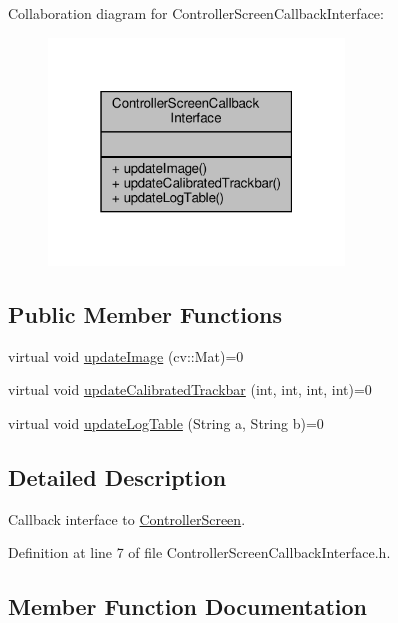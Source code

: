 Collaboration diagram for Controller\+Screen\+Callback\+Interface\+:
\nopagebreak
\begin{figure}[H]
\begin{center}
\leavevmode
\includegraphics[width=223pt]{class_controller_screen_callback_interface__coll__graph}
\end{center}
\end{figure}
\subsection*{Public Member Functions}
\begin{DoxyCompactItemize}
\item 
virtual void \hyperlink{class_controller_screen_callback_interface_a7d11a5d40ead88e7f89b8b1ee836b0cd}{update\+Image} (cv\+::\+Mat)=0
\item 
virtual void \hyperlink{class_controller_screen_callback_interface_aeee7c043e83e959de0788a9d2a5f70bb}{update\+Calibrated\+Trackbar} (int, int, int, int)=0
\item 
virtual void \hyperlink{class_controller_screen_callback_interface_af92ab0514459c690e357064676fa33f0}{update\+Log\+Table} (String a, String b)=0
\end{DoxyCompactItemize}


\subsection{Detailed Description}
Callback interface to \hyperlink{class_controller_screen}{Controller\+Screen}. 

Definition at line 7 of file Controller\+Screen\+Callback\+Interface.\+h.



\subsection{Member Function Documentation}
\mbox{\label{class_controller_screen_callback_interface_aeee7c043e83e959de0788a9d2a5f70bb}} 
